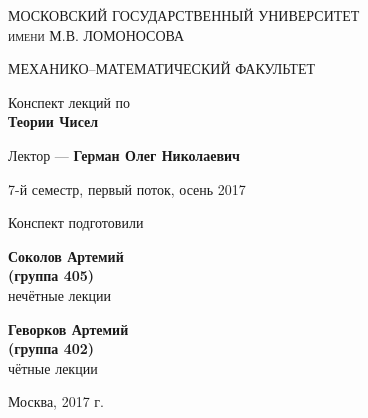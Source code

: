 

\begin{titlepage}

    \centering

    \large
    \scshape
    МОСКОВСКИЙ ГОСУДАРСТВЕННЫЙ УНИВЕРСИТЕТ~\\
    имени М.В. ЛОМОНОСОВА
 
    \vspace{0.8cm}
 
    МЕХАНИКО--МАТЕМАТИЧЕСКИЙ ФАКУЛЬТЕТ
    
    \vfill
    
    

    \vspace{0.35cm}

    \Huge
    Конспект лекций по~\\
    \textbf{%
        Теории Чисел
    }

    \vspace{0.5cm}

    \large
    Лектор --- 
    \textbf{%
        Герман Олег Николаевич
    }

    \vspace{0.8cm}
    
    7-й семестр, первый поток, осень 2017

    \vspace{1.8cm}

    \normalsize
    Конспект подготовили

    \vspace{0.4cm}

    \begin{minipage}{0.49\textwidth}
        \begin{flushleft}
            \textbf{Соколов Артемий\\(группа 405)}\\
            нечётные лекции
        \end{flushleft}
    \end{minipage}
    \begin{minipage}{0.49\textwidth}
        \begin{flushright}
            \textbf{Геворков Артемий\\(группа 402)}\\
            чётные лекции
        \end{flushright}
    \end{minipage}

    \vspace{1.5cm}

    \vfill
    \textnormal{Москва, 2017 г.}
\end{titlepage}


\restoregeometry
